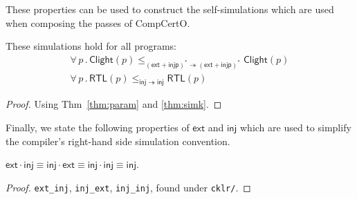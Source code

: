 \documentclass[acmsmall,authordraft]{acmart}
\newcommand{\kw}[1]{\ensuremath{ \mathsf{#1} }}
\begin{document}
These properties can be used to construct
the self-simulations which are used
when composing the passes of CompCertO.

\begin{theorem} \label{thm:lprops} %
These simulations hold
for all programs:
\begin{gather*}
\forall \, p \,.\,
  \kw{Clight}(p)
  \le_{(\kw{ext} + \kw{injp})^* \twoheadrightarrow (\kw{ext} + \kw{injp})^*}
  \kw{Clight}(p) \\
\forall \, p \,.\,
  \kw{RTL}(p)
  \le_{\kw{inj} \twoheadrightarrow \kw{inj}}
  \kw{RTL}(p)
\end{gather*}
\begin{proof}
Using Thm~\ref{thm:param} and \ref{thm:simk}.
\end{proof}
\end{theorem}

Finally,
we state the following properties of $\kw{ext}$ and $\kw{inj}$
which are used to simplify
the compiler's right-hand side simulation convention.

\begin{theorem} \label{thm:extinj}
$
  \kw{ext} \cdot \kw{inj} \equiv
  \kw{inj} \cdot \kw{ext} \equiv
  \kw{inj} \cdot \kw{inj} \equiv
  \kw{inj}
$.
\begin{proof}
\texttt{ext\_inj}, \texttt{inj\_ext}, \texttt{inj\_inj},
found under \texttt{cklr/}.
\end{proof}
\end{theorem}

\end{document}
